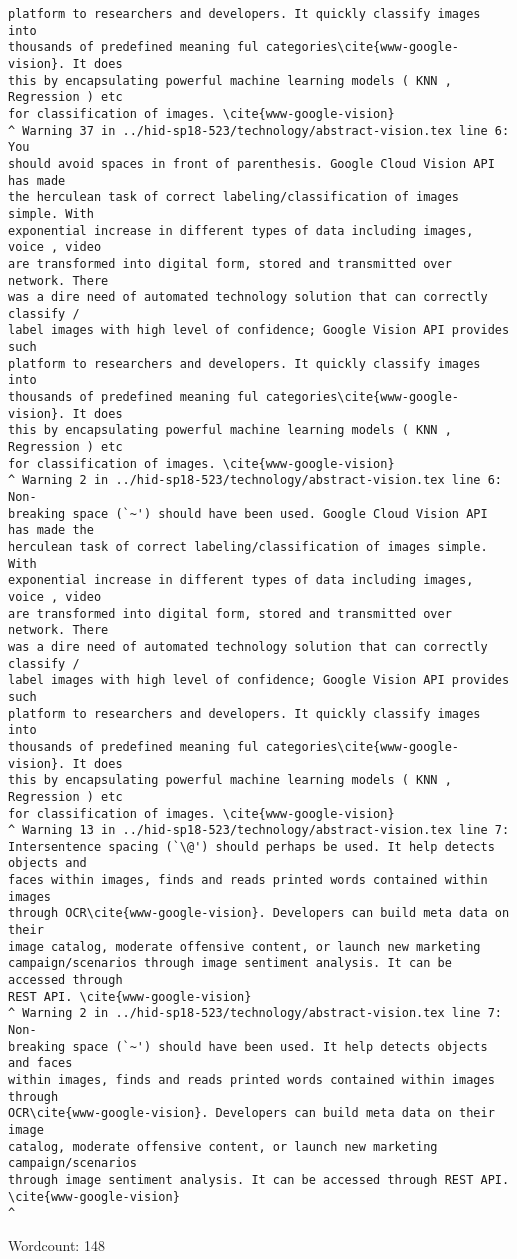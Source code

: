 \begin{IU}
\begin{tiny}
\begin{verbatim}
platform to researchers and developers. It quickly classify images into
thousands of predefined meaning ful categories\cite{www-google-vision}. It does
this by encapsulating powerful machine learning models ( KNN , Regression ) etc
for classification of images. \cite{www-google-vision}
^ Warning 37 in ../hid-sp18-523/technology/abstract-vision.tex line 6: You
should avoid spaces in front of parenthesis. Google Cloud Vision API has made
the herculean task of correct labeling/classification of images simple. With
exponential increase in different types of data including images, voice , video
are transformed into digital form, stored and transmitted over network. There
was a dire need of automated technology solution that can correctly classify /
label images with high level of confidence; Google Vision API provides such
platform to researchers and developers. It quickly classify images into
thousands of predefined meaning ful categories\cite{www-google-vision}. It does
this by encapsulating powerful machine learning models ( KNN , Regression ) etc
for classification of images. \cite{www-google-vision}
^ Warning 2 in ../hid-sp18-523/technology/abstract-vision.tex line 6: Non-
breaking space (`~') should have been used. Google Cloud Vision API has made the
herculean task of correct labeling/classification of images simple. With
exponential increase in different types of data including images, voice , video
are transformed into digital form, stored and transmitted over network. There
was a dire need of automated technology solution that can correctly classify /
label images with high level of confidence; Google Vision API provides such
platform to researchers and developers. It quickly classify images into
thousands of predefined meaning ful categories\cite{www-google-vision}. It does
this by encapsulating powerful machine learning models ( KNN , Regression ) etc
for classification of images. \cite{www-google-vision}
^ Warning 13 in ../hid-sp18-523/technology/abstract-vision.tex line 7:
Intersentence spacing (`\@') should perhaps be used. It help detects objects and
faces within images, finds and reads printed words contained within images
through OCR\cite{www-google-vision}. Developers can build meta data on their
image catalog, moderate offensive content, or launch new marketing
campaign/scenarios through image sentiment analysis. It can be accessed through
REST API. \cite{www-google-vision}
^ Warning 2 in ../hid-sp18-523/technology/abstract-vision.tex line 7: Non-
breaking space (`~') should have been used. It help detects objects and faces
within images, finds and reads printed words contained within images through
OCR\cite{www-google-vision}. Developers can build meta data on their image
catalog, moderate offensive content, or launch new marketing campaign/scenarios
through image sentiment analysis. It can be accessed through REST API.
\cite{www-google-vision}
^
\end{verbatim}
\end{tiny}

Wordcount: 148

\end{IU}

